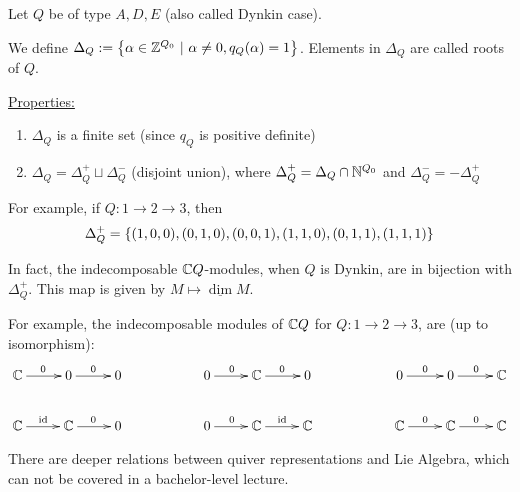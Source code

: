 \documentclass[twoside = false,	%
		headsepline,		%
		parskip = true,
		]{scrbook}						%
\begin{document}
    Let $Q$ be of type $A,D,E$ (also called Dynkin case).

    We define $\Delta_Q:= \left\{ \alpha \in \mathbb Z^{Q_0} \ | \ \alpha \neq 0, q_Q(\alpha) = 1\right\}$. Elements in $\Delta_Q$ are called roots of $Q$.

    \underline{Properties:}
    \begin{enumerate}
        \item $\Delta_Q$ is a finite set (since $q_Q$ is positive definite)
        \item $\Delta_Q = \Delta_Q^+ \sqcup \Delta_Q^-$ (disjoint union), where $\Delta_Q^+ = \Delta_Q \cap \mathbb N^{Q_0}$ and $\Delta_Q^{-} = - \Delta_Q^+$
    \end{enumerate}

    For example, if $Q: 1 \to 2 \to 3$, then
    \begin{equation*}
        \Delta_Q^+ = \left\{ (1,0,0),(0,1,0),(0,0,1),(1,1,0),(0,1,1),(1,1,1)\right\}
    \end{equation*}

    In fact, the indecomposable $\mathbb C Q$-modules, when $Q$ is Dynkin, are in bijection with $\Delta_Q^+$. This map is given by $M \mapsto \underline\dim M$.

    For example, the indecomposable modules of $\mathbb C Q$ for $Q: 1 \to 2 \to 3$, are (up to isomorphism):
    \begin{equation*}
    \xymatrix {
        \C \ar[r]^0 & 0 \ar[r]^0 & 0 & & 0 \ar[r]^0 & \C \ar[r]^0 & 0 & & 0 \ar[r]^0 & 0 \ar[r]^0 & \C \\
        \C \ar[r]^\id & \C \ar[r]^0 & 0 & & 0 \ar[r]^0 & \C \ar[r]^\id & \C & & \C \ar[r]^0 & \C \ar[r]^0 & \C
    }
    \end{equation*}

    There are deeper relations between quiver representations and Lie Algebra, which can not be covered in a bachelor-level lecture. 
    
\printbibliography
\end{document}
